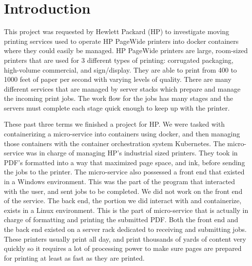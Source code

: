 \documentclass[onecolumn, draftclsnofoot,10pt, compsoc]{IEEEtran}
\begin{document}

\clearpage


\section{Introduction}




This project was requested by Hewlett Packard (HP) to investigate moving printing services used to operate HP PageWide printers into docker containers where they could easily be managed.
HP PageWide printers are large, room-sized printers that are used for 3 different types of printing: corrugated
packaging, high-volume commercial, and sign/display.
They are able to print from 400 to 1000 feet of paper per second with varying levels of quality.
There are many different services that are managed by server stacks which prepare and manage the incoming print jobs.
The work flow for the jobs has many stages and the servers must complete each stage quick enough to keep up with the printer.

These past three terms we finished a project for HP. 
We were tasked with containerizing a micro-service into containers using docker, and then managing those containers with the container orchestration system Kubernetes. 
The micro-service was in charge of managing HP's industrial sized printers. 
They took in PDF's formatted into a way that maximized page space, and ink, before sending the jobs to the printer. 
The micro-service also possessed a front end that existed in a Windows environment. 
This was the part of the program that interacted with the user, and sent jobs to be completed. 
We did not work on the front end of the service. 
The back end, the portion we did interact with and containerize, exists in a Linux environment. 
This is the part of micro-service that is actually in charge of formatting and printing the submitted PDF. 
Both the front end and the back end existed on a server rack dedicated to receiving and  submitting jobs. 
These printers usually print all day, and print thousands of yards of content very quickly so it requires a lot of processing power to make sure pages are prepared for printing at least as fast as they are printed.
\end{document}
